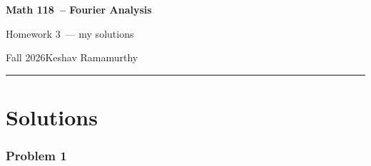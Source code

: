 \documentclass[11pt]{article}
\newcommand{\studentname}{Keshav Ramamurthy}
\newcommand{\coursename}{Math 118}
\newcommand{\courselongname}{Fourier Analysis}
\newcommand{\assignment}{Homework 3}
\newcommand{\term}{Fall 2026}
\newcommand{\1}{\mathbf{1}}
\theoremstyle{definition}
\begin{document}
\begin{center}
  {\Large\sffamily\bfseries \coursename\ -- \courselongname}\par\vspace{3pt}
  {\sffamily \assignment\ — my solutions}\par\vspace{3pt}
  {\small\sffamily \term\quad\textbullet\quad \studentname}
\end{center}
\medskip
\hrule
\bigskip


\clearpage

\section*{Solutions}
\subsubsection*{Problem 1}
\end{document}
